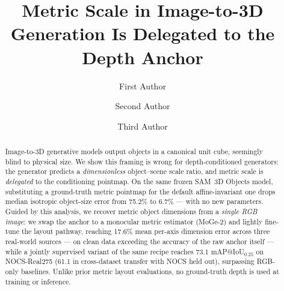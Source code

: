 \documentclass[runningheads]{llncs}
\begin{document}
\title{Metric Scale in Image-to-3D Generation Is Delegated to the Depth Anchor}


\author{First Author \and
Second Author \and
Third Author}



\maketitle


\begin{abstract}
Image-to-3D generative models output objects in a canonical unit cube, seemingly
blind to physical size. We show this framing is wrong for depth-conditioned
generators: the generator predicts a \emph{dimensionless} object--scene scale
ratio, and metric scale is \emph{delegated} to the conditioning pointmap. On the
same frozen SAM~3D Objects model, substituting a ground-truth metric pointmap for
the default affine-invariant one drops median isotropic object-size error from
75.2\% to 6.7\% --- with no new parameters. Guided by this analysis, we recover
metric object dimensions from a \emph{single RGB image}: we swap the anchor
to a monocular metric estimator (MoGe-2) and lightly fine-tune the layout pathway,
reaching 17.6\% mean per-axis dimension error across three real-world sources ---
on clean data exceeding the accuracy of the raw anchor itself --- while a jointly
supervised variant of the same recipe reaches 73.1 mAP@IoU$_{0.25}$ on
NOCS-Real275 (61.1 in cross-dataset transfer with NOCS held out), surpassing
RGB-only baselines. Unlike prior
metric layout evaluations, no ground-truth depth is used at training or inference.
\end{abstract}
\end{document}
